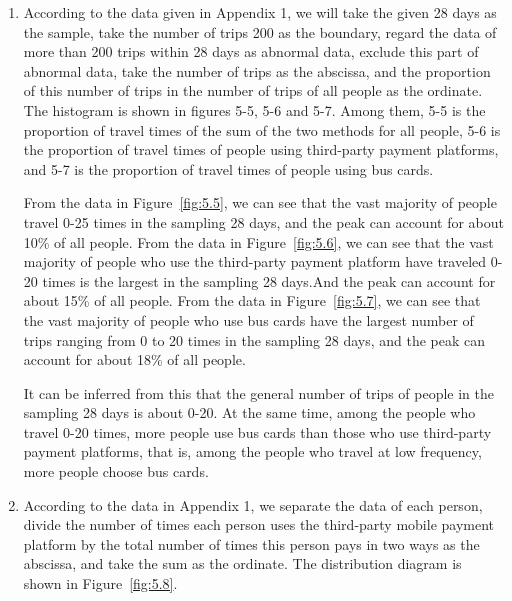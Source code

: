 \documentclass[../mcmpaper]{subfiles}
\begin{document}
\begin{enumerate}[label=\arabic*., format=\bfseries, itemindent=0pt, leftmargin=0pt, topsep=0pt, listparindent=\parindent, itemsep=1pt]
    \item According to the data given in Appendix 1, we will take the given 28 days as the sample, take the number of trips 200 as the boundary, regard the data of more than 200 trips within 28 days as abnormal data, exclude this part of abnormal data, take the number of trips as the abscissa, and the proportion of this number of trips in the number of trips of all people as the ordinate. The histogram is shown in figures 5-5, 5-6 and 5-7. Among them, 5-5 is the proportion of travel times of the sum of the two methods for all people, 5-6 is the proportion of travel times of people using third-party payment platforms, and 5-7 is the proportion of travel times of people using bus cards.
\par
From the data in Figure~\ref{fig:5.5}, we can see that the vast majority of people travel 0-25 times in the sampling 28 days, and the peak can account for about 10\% of all people. From the data in Figure~\ref{fig:5.6}, we can see that the vast majority of people who use the third-party payment platform have traveled 0-20 times is the largest in the sampling 28 days.And the peak can account for about 15\% of all people. From the data in Figure~\ref{fig:5.7}, we can see that the vast majority of people who use bus cards have the largest number of trips ranging from 0 to 20 times in the sampling 28 days, and the peak can account for about 18\% of all people.
\par
It can be inferred from this that the general number of trips of people in the sampling 28 days is about 0-20. At the same time, among the people who travel 0-20 times, more people use bus cards than those who use third-party payment platforms, that is, among the people who travel at low frequency, more people choose bus cards.
    \item According to the data in Appendix 1, we separate the data of each person, divide the number of times each person uses the third-party mobile payment platform by the total number of times this person pays in two ways as the abscissa, and take the sum as the ordinate. The distribution diagram is shown in Figure~\ref{fig:5.8}.\\
\begin{minipage}{1.0\linewidth}

\end{minipage}
\end{enumerate}
\end{document}
